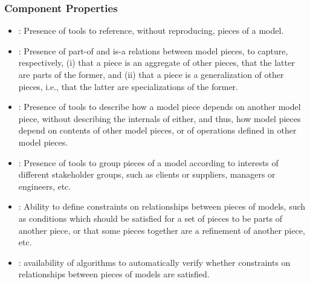 \documentclass[10pt, final, conference, compsocconf]{IEEEtran}
\begin{document}
\subsubsection{Component Properties}
\begin{itemize}
\item{: Presence of tools to reference, without reproducing, pieces of a model.}
\item{: Presence of part-of and is-a relations between model pieces, to capture, respectively, (i) that a piece is an aggregate of other pieces, that the latter are parts of the former, and (ii) that a piece is a generalization of other pieces, i.e., that the latter are specializations of the former.}
\item{: Presence of tools to describe how a model piece depends on another model piece, without describing the internals of either, and thus, how model pieces depend on contents of other model pieces, or of operations defined in other model pieces.}
\item{: Presence of tools to group pieces of a model according to interests of different stakeholder groups, such as clients or suppliers, managers or engineers, etc.}
\item{: Ability to define constraints on relationships between pieces of models, such as conditions which should be satisfied for a set of pieces to be parts of another piece, or that some pieces together are a refinement of another piece, etc.}
\item{: availability of algorithms to automatically verify whether constraints on relationships between pieces of models are satisfied.}
\end{itemize}

\end{document}
